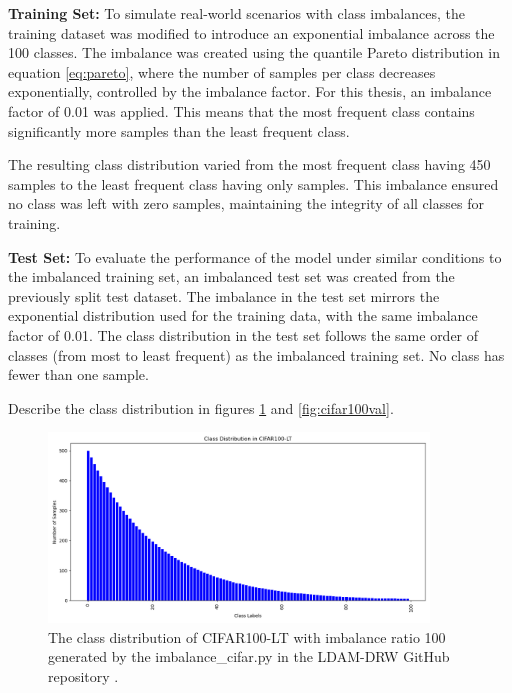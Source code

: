 \textbf{Training Set:} To simulate real-world scenarios with class imbalances, the training dataset was modified to introduce an exponential imbalance across the 100 classes. The imbalance was created using the quantile Pareto distribution in equation \eqref{eq:pareto}, where the number of samples per class decreases exponentially, controlled by the imbalance factor. For this thesis, an imbalance factor of 0.01 was applied. This means that the most frequent class contains significantly more samples than the least frequent class. 

The resulting class distribution varied from the most frequent class having 450 samples to the least frequent class having only  samples.  This imbalance ensured no class was left with zero samples, maintaining the integrity of all classes for training. 

\textbf{Test Set:} To evaluate the performance of the model under similar conditions to the imbalanced training set, an imbalanced test set was created from the previously split test dataset. The imbalance in the test set mirrors the exponential distribution used for the training data, with the same imbalance factor of 0.01. The class distribution in the test set follows the same order of classes (from most to least frequent) as the imbalanced training set. No class has fewer than one sample.

Describe the class distribution in figures \ref{fig:cifar100_imbalance_cifar} and \ref{fig:cifar100val}.

\begin{figure}[H]
    \centering
    \includegraphics[width=0.9\textwidth]{Images/Plots/Class Distribution for CIFAR100-LT.png}
    \caption{The class distribution of CIFAR100-LT with imbalance ratio 100 generated by the imbalance\_cifar.py in the LDAM-DRW GitHub repository \cite{kaidic_ldam_drw}.}
    \label{fig:cifar100_imbalance_cifar}
\end{figure}

